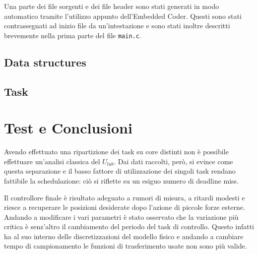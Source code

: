 Una parte dei file sorgenti e dei file header sono stati generati in modo automatico tramite l'utilizzo appunto dell'Embedded Coder. Questi sono stati contrassegnati ad inizio file da un'intestazione e sono stati inoltre descritti brevemente nella prima parte del file \texttt{main.c}.

\subsection{Data structures}


\subsection{Task}

\FloatBarrier

\section{Test e Conclusioni}

Avendo effettuato una ripartizione dei task su core distinti non \`e possibile effettuare un'analisi classica del $U_{lub}$. Dai dati raccolti, per\`o, si evince come questa separazione e il basso fattore di utilizzazione dei singoli task rendano fattibile la schedulazione: ci\`o si riflette su un esiguo numero di deadline miss.

Il controllore finale \`e risultato adeguato a rumori di misura, a ritardi modesti e riesce a recuperare le posizioni desiderate dopo l'azione di piccole forze esterne. Andando a modificare i vari parametri \`e stato osservato che la variazione pi\`u critica \`e senz'altro il cambiamento del periodo del task di controllo. 
Questo infatti ha al suo interno delle discretizzazioni del modello fisico e andando a cambiare tempo di campionamento le funzioni di trasferimento usate non sono pi\`u valide.

	
